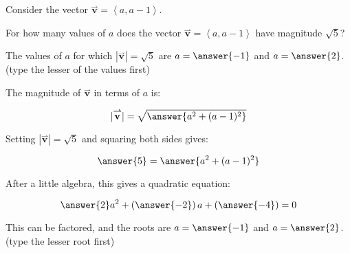 \documentclass{ximera}
\author{Jim Talamo}
\begin{document}
\begin{exercise}
Consider the vector $\overset{\boldsymbol{\rightharpoonup}}{\mathbf{v}} = \left\langle a,a-1 \right\rangle$.

For how many values of $a$ does the vector $\overset{\boldsymbol{\rightharpoonup}}{\mathbf{v}} = \left\langle a,a-1 \right\rangle$ have magnitude $\sqrt{5}$?

\begin{multipleChoice}
\end{multipleChoice}

The values of $a$ for which $|\overset{\boldsymbol{\rightharpoonup}}{\mathbf{v}}| = \sqrt{5}$ are $a= \answer{-1}$ and $a=\answer{2}$.
(type the lesser of the values first)

\begin{hint}
The magnitude of $\overset{\boldsymbol{\rightharpoonup}}{\mathbf{v}}$ in terms of $a$ is:

\[
|\overset{\boldsymbol{\rightharpoonup}}{\mathbf{v}}| = \sqrt{\answer{a^2+(a-1)^2} }
\]

Setting $|\overset{\boldsymbol{\rightharpoonup}}{\mathbf{v}}| = \sqrt{5}$ and squaring both sides gives:

\[
\answer{5} = \answer{a^2+(a-1)^2}
\]

After a little algebra, this gives a quadratic equation:

\[
\answer{2}a^2 +\left(\answer{-2}\right)a+\left(\answer{-4}\right) = 0
\]

This can be factored, and the roots are $a=\answer{-1}$ and $a=\answer{2}$.
(type the lesser root first)
\end{hint}


\end{exercise}
\end{document}
